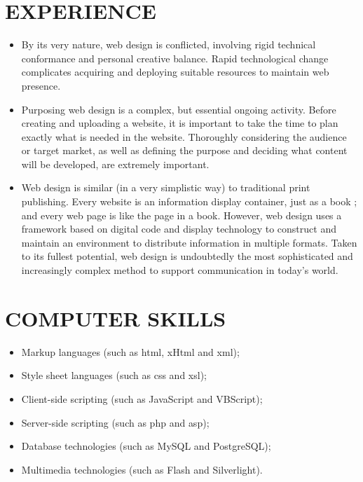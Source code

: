 \documentclass[10pt]{article}
\newcommand{%
	\thumbnail}[2]{
		\raggedleft\hfill{\href{#1}
			{\trick \raisebox{-3pt}{.}
				\fbox{
			\texttt{[image: \#2]}}
			\raisebox{70pt}{.}}}
			}
\begin{document}
\begin{minipage}[t]{0.65\textwidth}
\section{EXPERIENCE}
\vspace{0pt}
\begin{itemize}[leftmargin=1cm, itemsep=0pt, topsep=5pt] \Text\raggedright
	\item By its very nature, web design is conflicted, involving rigid technical conformance and personal creative balance. Rapid technological change complicates acquiring and deploying suitable resources to maintain web presence.

	\item Purposing web design is a complex, but essential ongoing activity. Before creating and uploading a website, it is important to take the time to plan exactly what is needed in the website. Thoroughly considering the audience or target market, as well as defining the purpose and deciding what content will be developed, are extremely important.

	\item Web design is similar (in a very simplistic way) to traditional print publishing. Every website is an information display container, just as a book ; and every web page is like the page in a book. However, web design uses a framework based on digital code and display technology to construct and maintain an environment to distribute information in multiple formats. Taken to its fullest potential, web design is undoubtedly the most sophisticated and increasingly complex method to support communication in today's world.

\end{itemize}
\vspace{10pt}
\section{COMPUTER SKILLS}
\begin{itemize}[leftmargin=1cm, itemsep=0pt, topsep=5pt]\Text
\item Markup languages (such as {\TextSC html}, {\TextSC xHtml} and {\TextSC xml});
\item Style sheet languages (such as {\TextSC css} and {\TextSC xsl});
\item Client-side scripting (such as JavaScript and VBScript);
\item Server-side scripting (such as {\TextSC php} and {\TextSC asp});
\item Database technologies (such as MySQL and PostgreSQL);
\item Multimedia technologies (such as Flash and Silverlight).
\end{itemize}
\end{minipage} %
\end{document}
